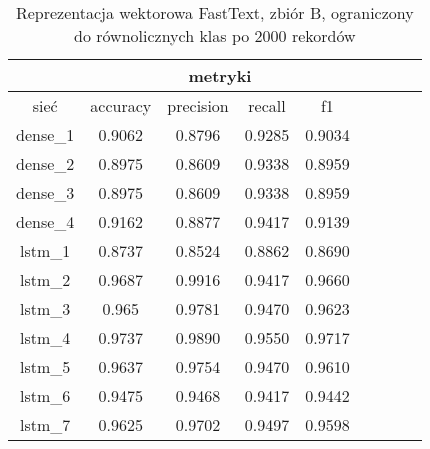 \begin{table}[p]  \centering
    \caption{Reprezentacja wektorowa FastText, zbiór B, ograniczony do \label{tab:wyniki_fasttext_B_lim}
        równolicznych klas po 2000 rekordów}
        \label{tab:wyniki_300_eks3}
        \begin{tabular} {|c|c|c|c|c|c|c|c|c| }    \hline
                 & \multicolumn{4}{c|}{metryki}                                                                                        \\ \hline
        sieć     & accuracy                     & precision                  & recall                     & f1                         \\ \hline
        dense\_1 & 0.9062                       & 0.8796                     & 0.9285                     & 0.9034                     \\ \hline
        dense\_2 & 0.8975                       & 0.8609                     & 0.9338                     & 0.8959                     \\ \hline
        dense\_3 & 0.8975                       & 0.8609                     & 0.9338                     & 0.8959                     \\ \hline
        dense\_4 & 0.9162                       & 0.8877                     & 0.9417                     & 0.9139                     \\ \hline
        lstm\_1  & 0.8737                       & 0.8524                     & 0.8862                     & 0.8690                     \\ \hline
        lstm\_2  & 0.9687                       & 0.9916                     & 0.9417                     & 0.9660                     \\ \hline
        lstm\_3  & 0.965                        & 0.9781                     & 0.9470                     & 0.9623                     \\ \hline
        lstm\_4  & 0.9737                       & 0.9890                     & 0.9550                     & 0.9717                     \\ \hline
        lstm\_5  & 0.9637                       & 0.9754                     & 0.9470                     & 0.9610                     \\ \hline
        lstm\_6  & 0.9475                       & 0.9468                     & 0.9417                     & 0.9442                     \\ \hline
        lstm\_7  & 0.9625                       & 0.9702                     & 0.9497                     & 0.9598                     \\ \hline

\end{tabular}
\end{table}
